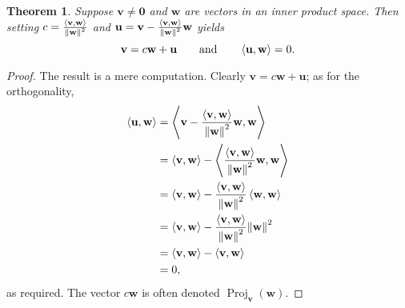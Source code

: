 \documentclass[11pt]{article}
\renewcommand{\vec}[1]{\mathbf{#1}}
\newtheorem{theorem}{Theorem}
\begin{document}
\begin{theorem}
	Suppose $\vec{v} \ne \vec{0}$ and $\vec{w}$ are vectors in an inner product space. Then setting $c = \frac{\ev{\vec{v}, \vec{w}}}{\norm{\vec{w}}^{2}}$ and $\vec{u} = \vec{v} - \frac{\ev{\vec{v}, \vec{w}}}{\norm{\vec{w}}^{2}} \vec{w}$ yields
	\[
		\vec{v} = c \vec{w} + \vec{u} \qquad \text{and} \qquad \ev{\vec{u}, \vec{w}} = 0.
	\]
\end{theorem}
\begin{adjustwidth}{1cm}{}
	\begin{proof}
		The result is a mere computation. Clearly $\vec{v} = c \vec{w} + \vec{u}$; as for the orthogonality,
		\begin{align*}
			\ev{\vec{u}, \vec{w}} &= \ev{\vec{v} - \frac{\ev{\vec{v}, \vec{w}}}{\norm{\vec{w}}^{2}} \vec{w}, \vec{w}} \\
			&= \ev{\vec{v}, \vec{w}} - \ev{\frac{\ev{\vec{v}, \vec{w}}}{\norm{\vec{w}}^{2}} \vec{w}, \vec{w}} \\
			&= \ev{\vec{v}, \vec{w}} - \frac{\ev{\vec{v}, \vec{w}}}{\norm{\vec{w}}^{2}} \ev{\vec{w}, \vec{w}}\\ 
			&= \ev{\vec{v}, \vec{w}} - \frac{\ev{\vec{v}, \vec{w}}}{\norm{\vec{w}}^{2}} \norm{\vec{w}}^{2} \\
			&= \ev{\vec{v}, \vec{w}} - \ev{\vec{v}, \vec{w}} \\
			&= 0,
		\end{align*}
		as required. The vector $c \vec{w}$ is often denoted $\operatorname{Proj}_{\vec{v}}(\vec{w})$.
	\end{proof}
\end{adjustwidth}
\end{document}
